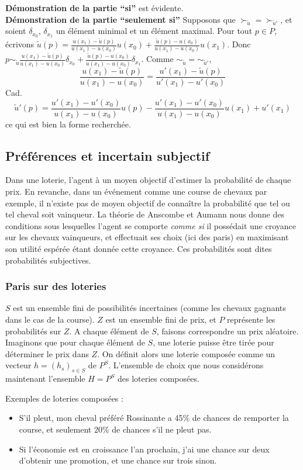\noindent
{\bf Démonstration de la partie ``si''} est évidente.\\
{\bf Démonstration de la partie ``seulement si''} Supposons que
$\succ_{\tilde u} = \succ_{\tilde u'}$, et soient $\delta_{x_0}$,
$\delta_{x_1}$ un élément minimal et un élément maximal. Pour tout
$p\in P$, écrivons $\tilde u(p)= \frac{u(x_1)-\tilde
u(p)}{u(x_1)-u(x_0)}u(x_0)+\frac{\tilde
u(p)-u(x_0)}{u(x_1)-u(x_0)}u(x_1)$. Donc $p\sim_{\tilde
u}\frac{u(x_1)-\tilde
u(p)}{u(x_1)-u(x_0)}\delta_{x_0}+\frac{\tilde
u(p)-u(x_0)}{u(x_1)-u(x_0)}\delta_{x_1}$. Comme $\sim_{\tilde
u}=\sim_{\tilde u'}$,
$$%
\frac{u(x_1)-\tilde u(p)}{u(x_1)-u(x_0)} = \frac{u'(x_1)-\tilde
u(p)}{u'(x_1)-u'(x_0)}
$$%
Cad.
$$%
\tilde u'(p)= \frac{u'(x_1)-u'(x_0)}{u(x_1)-u(x_0)}u(p)-
\frac{u'(x_1)-u'(x_0)}{u(x_1)-u(x_0)}u(x_1) + u'(x_1)
$$%
ce qui est bien la forme recherchée.
\subsection{Préférences et incertain subjectif}
Dans une loterie, l'agent à un moyen objectif d'estimer la
probabilité de chaque prix. En revanche, dans un événement comme
une course de chevaux par exemple, il n'existe pas de moyen
objectif de conna\^itre la probabilité que tel ou tel cheval soit
vainqueur. La théorie de Anscombe et Aumann nous donne des
conditions sous lesquelles l'agent se comporte {\em comme si} il
possédait une croyance sur les chevaux vainqueurs, et effectuait
ses choix (ici des paris) en maximisant son utilité espérée étant
donnée cette croyance. Ces probabilités sont dites probabilités
subjectives.

\subsubsection{Paris sur des loteries}
$S$ est un ensemble fini de possibilités incertaines (comme les
chevaux gagnants dans le cas de la course). $Z$ est un ensemble
fini de prix, et $P$ représente les probabilités sur $Z$. A chaque
élément de $S$, faisons correspondre un prix aléatoire. Imaginons
que pour chaque élément de $S$, une loterie puisse \^etre tirée
pour déterminer le prix dans $Z$. On définit alors une {loterie
composée} comme un vecteur $h =(h_s)_{s\in S}$ de $P^S$.
L'ensemble de choix que nous considérons maintenant l'ensemble $H=
P^S$ des loteries composées.

Exemples de loteries composées :
\begin{itemize}
\item S'il pleut, mon cheval préféré Rossinante a 45\% de chances
de remporter la course, et seulement 20\% de chances s'il ne pleut
pas.%
\item Si l'économie est en croissance l'an prochain, j'ai une
chance sur deux d'obtenir une promotion, et une chance sur trois
sinon.
\end{itemize}

